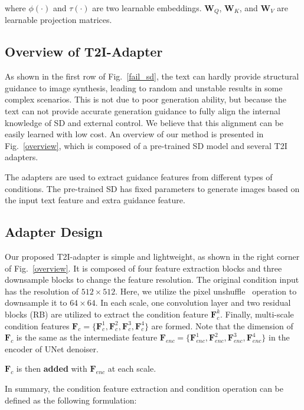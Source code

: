 where $\phi(\cdot)$ and $\tau(\cdot)$ are two learnable embeddings. $\mathbf{W}_Q$, $\mathbf{W}_K$, and $\mathbf{W}_V$ are learnable projection matrices.

\subsection{Overview of T2I-Adapter} As shown in the first row of Fig.~\ref{fail_sd}, the text can hardly provide structural guidance to image synthesis, leading to random and unstable results in some complex scenarios. This is not due to poor generation ability, but because the text can not provide accurate generation guidance to fully align the internal knowledge of SD and external control. We believe that this alignment can be easily learned with low cost. An overview of our method is presented in Fig.~\ref{overview}, which is composed of a pre-trained SD model and several T2I adapters. 

The adapters are used to extract guidance features from different types of conditions. The pre-trained SD has fixed parameters to generate images based on the input text feature and extra guidance feature. 

\subsection{Adapter Design}

Our proposed T2I-adapter is simple and lightweight, as shown in the right corner of Fig.~\ref{overview}. It is composed of four feature extraction blocks and three downsample blocks to change the feature resolution. The original condition input has the resolution of $512\times 512$. Here, we utilize the pixel unshuffle~\cite{shuffle} operation to downsample it to $64\times 64$. In each scale, one convolution layer and two residual blocks (RB) are utilized to extract the condition feature $\mathbf{F}_{c}^k$. Finally, multi-scale condition features $\mathbf{F}_{c}=\{\mathbf{F}_c^1, \mathbf{F}_c^2, \mathbf{F}_c^3, \mathbf{F}_c^4\}$ are formed. Note that the dimension of $\mathbf{F}_{c}$ is the same as the intermediate feature $\mathbf{F}_{enc}=\{\mathbf{F}_{enc}^1, \mathbf{F}_{enc}^2, \mathbf{F}_{enc}^3, \mathbf{F}_{enc}^4\}$ in the encoder of UNet denoiser.

 $\mathbf{F}_c$ is then \textbf{added} with $\mathbf{F}_{enc}$ at each scale.

 In summary, the condition feature extraction and condition operation can be defined as the following formulation:

